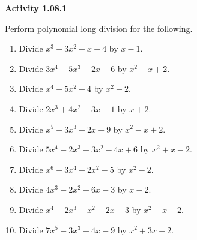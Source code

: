 \vspace{0.3ex}
\noindent\textbf{Activity 1.08.1}

\vspace{0.2ex}

Perform polynomial long division for the following.
\begin{enumerate}
    \item Divide \(x^3 + 3x^2 - x - 4\) by \(x - 1\).
    \item Divide \(3x^4 - 5x^3 + 2x - 6\) by \(x^2 - x + 2\).
    \item Divide \(x^4 - 5x^2 + 4\) by \(x^2 - 2\).
    \item Divide \(2x^3 + 4x^2 - 3x - 1\) by \(x + 2\).
    \item Divide \(x^5 - 3x^3 + 2x - 9\) by \(x^2 - x + 2\).
    \item Divide \(5x^4 - 2x^3 + 3x^2 - 4x + 6\) by \(x^2 + x - 2\).
    \item Divide \(x^6 - 3x^4 + 2x^2 - 5\) by \(x^2 - 2\).
    \item Divide \(4x^3 - 2x^2 + 6x - 3\) by \(x - 2\).
    \item Divide \(x^4 - 2x^3 + x^2 - 2x + 3\) by \(x^2 - x + 2\).
    \item Divide \(7x^5 - 3x^3 + 4x - 9\) by \(x^2 + 3x - 2\).
\end{enumerate}

